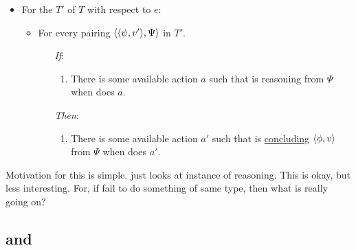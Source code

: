 \begin{note}
\begin{definition}[\tC{2}]
    \begin{itemize}[noitemsep]
    \item
      For the  \(T'\) of \(T\) with respect to \(e\):
      \begin{itemize}[noitemsep]
      \item
        For every pairing \(\langle \langle \psi, v' \rangle, \Psi \rangle\) in \(T'\).
        \begin{itemize}[noitemsep]
        \item[\emph{If}:]
          \begin{enumerate}[label=\alph*., ref=(\alph*), series=tRSketch]
          \item
            There is some available action \(a\) such that \vAgent{} is reasoning from \(\Psi\) when \vAgent{} does \(a\).
          \end{enumerate}
        \item[\emph{Then}:]
          \begin{enumerate}[label=\alph*., ref=(\alph*), resume*=tRSketch]
          \item
            There is some available action \(a'\) such that \vAgent{} is \underline{concluding} \(\langle \phi, v \rangle\) from \(\Psi\) when \vAgent{} does \(a'\).
          \end{enumerate}
        \end{itemize}
      \end{itemize}
    \end{itemize}
    \vspace{-\baselineskip}
  \end{definition}

  Motivation for this is simple.
  \tR{} just looks at instance of reasoning.
  This is okay, but less interesting.
  For, if fail to do something of same type, then what is really going on?
\end{note}

\subsection{ and }
\label{cha:typical:tC:fc}

